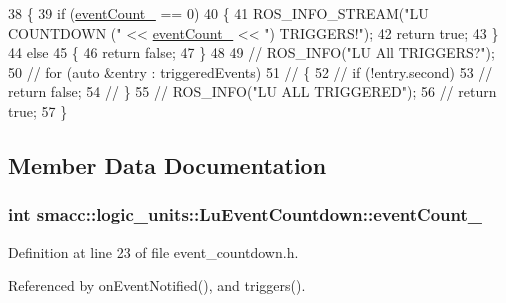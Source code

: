 \begin{DoxyCode}
38 \{
39     \textcolor{keywordflow}{if} (\hyperlink{classsmacc_1_1logic__units_1_1LuEventCountdown_a70fa43cf7f9970cc0b9172d4845a4c2e}{eventCount\_} == 0)
40     \{
41         ROS\_INFO\_STREAM(\textcolor{stringliteral}{"LU COUNTDOWN ("} << \hyperlink{classsmacc_1_1logic__units_1_1LuEventCountdown_a70fa43cf7f9970cc0b9172d4845a4c2e}{eventCount\_} << \textcolor{stringliteral}{") TRIGGERS!"});
42         \textcolor{keywordflow}{return} \textcolor{keyword}{true};
43     \}
44     \textcolor{keywordflow}{else}
45     \{
46         \textcolor{keywordflow}{return} \textcolor{keyword}{false};
47     \}
48 
49     \textcolor{comment}{// ROS\_INFO("LU All TRIGGERS?");}
50     \textcolor{comment}{// for (auto &entry : triggeredEvents)}
51     \textcolor{comment}{// \{}
52     \textcolor{comment}{//     if (!entry.second)}
53     \textcolor{comment}{//         return false;}
54     \textcolor{comment}{// \}}
55     \textcolor{comment}{// ROS\_INFO("LU ALL TRIGGERED");}
56     \textcolor{comment}{// return true;}
57 \}
\end{DoxyCode}


\subsection{Member Data Documentation}
\subsubsection[{\texorpdfstring{event\+Count\+\_\+}{eventCount_}}]{\setlength{\rightskip}{0pt plus 5cm}int smacc\+::logic\+\_\+units\+::\+Lu\+Event\+Countdown\+::event\+Count\+\_\+\hspace{0.3cm}{\ttfamily [private]}}\hypertarget{classsmacc_1_1logic__units_1_1LuEventCountdown_a70fa43cf7f9970cc0b9172d4845a4c2e}{}\label{classsmacc_1_1logic__units_1_1LuEventCountdown_a70fa43cf7f9970cc0b9172d4845a4c2e}


Definition at line 23 of file event\+\_\+countdown.\+h.



Referenced by on\+Event\+Notified(), and triggers().

